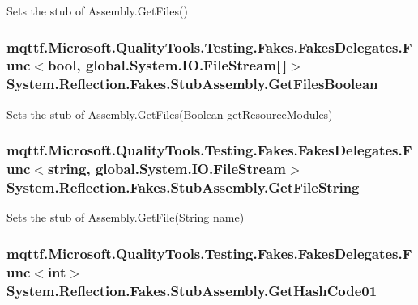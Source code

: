 Sets the stub of Assembly.\-Get\-Files()

\hypertarget{class_system_1_1_reflection_1_1_fakes_1_1_stub_assembly_a762161788938208182fd455ca3a18b38}{
\subsubsection[{Get\-Files\-Boolean}]{\setlength{\rightskip}{0pt plus 5cm}mqttf.\-Microsoft.\-Quality\-Tools.\-Testing.\-Fakes.\-Fakes\-Delegates.\-Func$<$bool, global.\-System.\-I\-O.\-File\-Stream\mbox{[}$\,$\mbox{]}$>$ System.\-Reflection.\-Fakes.\-Stub\-Assembly.\-Get\-Files\-Boolean}}\label{class_system_1_1_reflection_1_1_fakes_1_1_stub_assembly_a762161788938208182fd455ca3a18b38}


Sets the stub of Assembly.\-Get\-Files(\-Boolean get\-Resource\-Modules)

\hypertarget{class_system_1_1_reflection_1_1_fakes_1_1_stub_assembly_a6463dc811725af16cc17d32328c13ae9}{
\subsubsection[{Get\-File\-String}]{\setlength{\rightskip}{0pt plus 5cm}mqttf.\-Microsoft.\-Quality\-Tools.\-Testing.\-Fakes.\-Fakes\-Delegates.\-Func$<$string, global.\-System.\-I\-O.\-File\-Stream$>$ System.\-Reflection.\-Fakes.\-Stub\-Assembly.\-Get\-File\-String}}\label{class_system_1_1_reflection_1_1_fakes_1_1_stub_assembly_a6463dc811725af16cc17d32328c13ae9}


Sets the stub of Assembly.\-Get\-File(\-String name)

\hypertarget{class_system_1_1_reflection_1_1_fakes_1_1_stub_assembly_a909d6b74a4e0593c29585eae91f5b662}{
\subsubsection[{Get\-Hash\-Code01}]{\setlength{\rightskip}{0pt plus 5cm}mqttf.\-Microsoft.\-Quality\-Tools.\-Testing.\-Fakes.\-Fakes\-Delegates.\-Func$<$int$>$ System.\-Reflection.\-Fakes.\-Stub\-Assembly.\-Get\-Hash\-Code01}}\label{class_system_1_1_reflection_1_1_fakes_1_1_stub_assembly_a909d6b74a4e0593c29585eae91f5b662}


